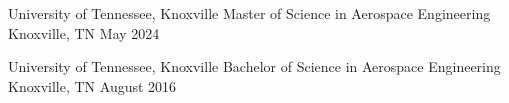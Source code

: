 
\begin{cventries}
  \cventry
    {University of Tennessee, Knoxville}
    {Master of Science in Aerospace Engineering} %
    {Knoxville, TN} %
    {May 2024} %
    {
      \begin{cvitems} %
         \item {}
      \end{cvitems}
    }

  \cventry
    {University of Tennessee, Knoxville}
    {Bachelor of Science in Aerospace Engineering} %
    {Knoxville, TN} %
    {August 2016} %
    {
      \begin{cvitems} %
      \end{cvitems}
    }
\end{cventries}

